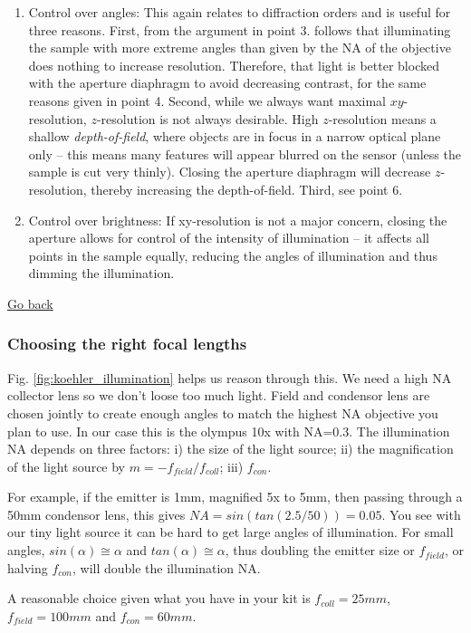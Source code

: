 \documentclass[a4paper]{report}
\begin{document}
\begin{enumerate}
    \item Control over angles: This again relates to diffraction orders and is useful for three reasons. First, from the argument in point 3. follows that illuminating the sample with more extreme angles than given by the NA of the objective does nothing to increase resolution. Therefore, that light is better blocked with the aperture diaphragm to avoid decreasing contrast, for the same reasons given in point 4. Second, while we always want maximal $xy$-resolution, $z$-resolution is not always desirable. High $z$-resolution means a shallow \emph{depth-of-field}, where objects are in focus in a narrow optical plane only -- this means many features will appear blurred on the sensor (unless the sample is cut very thinly). Closing the aperture diaphragm will decrease $z$-resolution, thereby increasing the depth-of-field. Third, see point 6.
    \item Control over brightness: If xy-resolution is not a major concern, closing the aperture allows for control of the intensity of illumination -- it affects all points in the sample equally, reducing the angles of illumination and thus dimming the illumination.
\end{enumerate}

   \noindent
   \hyperlink{hintBack-illumination}{Go back}


\subsubsection{Choosing the right focal lengths}
Fig. \ref{fig:koehler_illumination} helps us reason through this. We need a high NA collector lens so we don't loose too much light. Field and condensor lens are chosen jointly to create enough angles to match the highest NA objective you plan to use. In our case this is the olympus 10x with NA=0.3. The illumination NA depends on three factors: i) the size of the light source; ii) the magnification of the light source by $m=-f_{field}/f_{coll}$; iii) $f_{con}$.

For example, if the emitter is 1mm, magnified 5x to 5mm, then passing through a 50mm condensor lens, this gives $NA=sin(tan(2.5/50))=0.05$. You see with our tiny light source it can be hard to get large angles of illumination. For small angles, $sin(\alpha)\cong\alpha$ and $tan(\alpha)\cong\alpha$, thus doubling the emitter size or $f_{field}$, or halving $f_{con}$, will double the illumination NA.

A reasonable choice given what you have in your kit is $f_{coll}=25mm$, $f_{field}=100mm$ and $f_{con}=60mm$.
\end{document}
